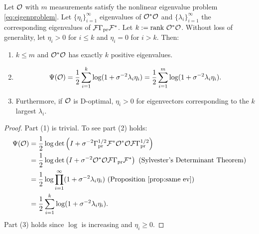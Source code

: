 \begin{proposition}\label{prop:true target}
  Let $\mathcal{O}$ with $m$ measurements satisfy the nonlinear eigenvalue
  problem \eqref{eq:eigenproblem}. Let $\{\eta_i\}_{i=1}^{\infty}$
  eigenvalues of $\mathcal{O}^*\mathcal{O}$ and $\{\lambda_i\}_{i=1}^{\infty}$ the
  corresponding eigenvalues of $\mathcal{F} \Gamma_{\textup{pr}} \mathcal{F}^*$. Let $k:=\textup{rank}\ 
  \mathcal{O}^*\mathcal{O}$. Without loss of generality, let $\eta_i > 0$ for $i\leq
  k$ and $\eta_i = 0$ for $i > k$. Then:
  \begin{enumerate}
    \item $k \leq m$ and $\mathcal{O}^*\mathcal{O}$ has exactly $k$ positive
      eigenvalues.
    \item
      \begin{equation*}
        \tar(\obs) = \frac12 \sum_{i=1}^{k} \log (1 + \sigma^{-2}\lambda_i\eta_i) = \frac12 \sum_{i=1}^{m} \log (1 + \sigma^{-2}\lambda_i\eta_i).
      \end{equation*}
    \item Furthermore, if $\mathcal{O}$ is D-optimal, $\eta_i > 0$ for
      eigenvectors corresponding to the $k$ largest $\lambda_i$.
  \end{enumerate}
\end{proposition}
\begin{proof}
  Part (1) is trivial. To see part (2) holds: 
  \begin{align}
    \begin{split}
      \tar(\obs) &= \frac12\log \det \left (I + \sigma^{-2} \prcov^{1/2} \fwd ^* \obs^*
      \obs \fwd \prcov^{1/2}\right )\\%
      &= \frac12 \log \det \left (I + \sigma^{-2} \obs^* \obs \fwd
      \prcov\fwd^* \right ) \text{ (Sylvester's Determinant
      Theorem)}\\
      &=\frac12 \log \prod_{i=1}^{\infty} ( 1 + \sigma^{-2} \lambda_i\eta_i ) \text{ (Proposition \ref{prop:same ev})} \\
      &=\frac12 \sum_{i=1}^{k} \log (1 + \sigma^{-2}\lambda_i\eta_i). 
    \end{split}
  \end{align}
  Part (3) holds since $\log$ is increasing and $\eta_i \geq 0$.
\end{proof}


